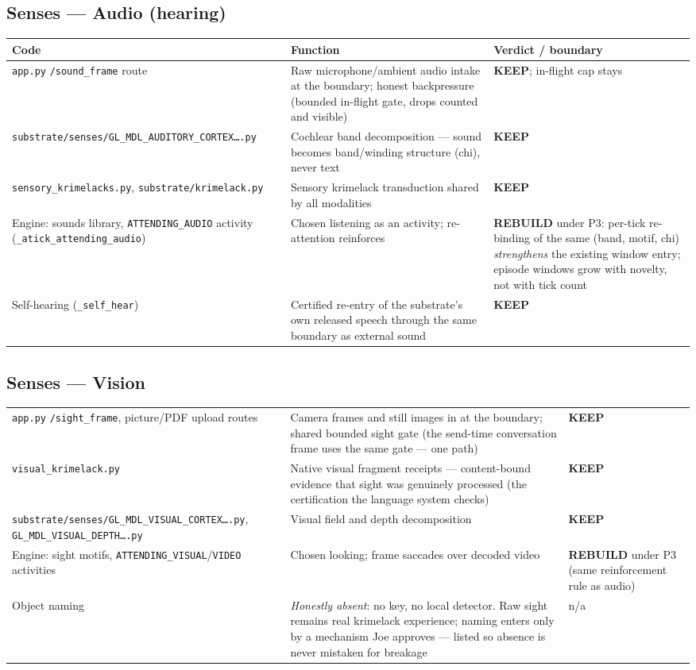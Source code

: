 \documentclass[11pt]{article}
\newcommand{\keep}{\textbf{KEEP}}
\newcommand{\rebuild}{\textbf{REBUILD}}
\begin{document}
\subsection{Senses — Audio (hearing)}
\begin{longtable}{p{} p{} p{}}
\toprule
\textbf{Code} & \textbf{Function} & \textbf{Verdict / boundary} \\
\midrule
\texttt{app.py} \texttt{/sound\_frame} route &
Raw microphone/ambient audio intake at the boundary; honest backpressure
(bounded in-flight gate, drops counted and visible) &
\keep{}; in-flight cap stays \\
\texttt{substrate/senses/GL\_MDL\_AUDITORY\_CORTEX\ldots.py} &
Cochlear band decomposition — sound becomes band/winding structure (chi),
never text &
\keep{} \\
\texttt{sensory\_krimelacks.py}, \texttt{substrate/krimelack.py} &
Sensory krimelack transduction shared by all modalities &
\keep{} \\
Engine: sounds library, \texttt{ATTENDING\_AUDIO} activity
(\texttt{\_atick\_attending\_audio}) &
Chosen listening as an activity; re-attention reinforces &
\rebuild{} under P3: per-tick re-binding of the same (band, motif, chi)
\emph{strengthens} the existing window entry; episode windows grow with
novelty, not with tick count \\
Self-hearing (\texttt{\_self\_hear}) &
Certified re-entry of the substrate's own released speech through the same
boundary as external sound &
\keep{} \\
\bottomrule
\end{longtable}

\subsection{Senses — Vision}
\begin{longtable}{p{} p{} p{}}
\toprule
\texttt{app.py} \texttt{/sight\_frame}, picture/PDF upload routes &
Camera frames and still images in at the boundary; shared bounded sight gate
(the send-time conversation frame uses the same gate — one path) &
\keep{} \\
\texttt{visual\_krimelack.py} &
Native visual fragment receipts — content-bound evidence that sight was
genuinely processed (the certification the language system checks) &
\keep{} \\
\texttt{substrate/senses/GL\_MDL\_VISUAL\_CORTEX\ldots.py},
\texttt{GL\_MDL\_VISUAL\_DEPTH\ldots.py} &
Visual field and depth decomposition &
\keep{} \\
Engine: sight motifs, \texttt{ATTENDING\_VISUAL}/\texttt{VIDEO} activities &
Chosen looking; frame saccades over decoded video &
\rebuild{} under P3 (same reinforcement rule as audio) \\
Object naming &
\emph{Honestly absent}: no key, no local detector. Raw sight remains real
krimelack experience; naming enters only by a mechanism Joe approves —
listed so absence is never mistaken for breakage &
n/a \\
\bottomrule
\end{longtable}
\end{document}
